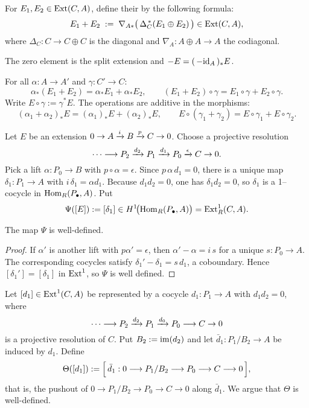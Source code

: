 
For \( E_1,E_2\in\operatorname{Ext}(C,A) \), define their  by the following formula:
\[
	E_1+E_2\;:=\; \nabla_{A*}\bigl(\,\Delta_C^{\,*}(E_1\oplus E_2)\,\bigr) \in \operatorname{Ext}(C,A),
\]
where \( \Delta_C: C\to C\oplus C \) is the diagonal and \( \nabla_A: A\oplus A\to A \) the codiagonal.

\vspace*{2mm}

The zero element is the split extension and \( -E=(\,-\mathrm{id}_A\,)_{*}E \).


For all \( \alpha: A\to A' \) and \( \gamma: C'\to C \):
\[
	\alpha_{*}(E_1+E_2)=\alpha_{*}E_1+\alpha_{*}E_2,\qquad (E_1+E_2)\circ\gamma = E_1\circ\gamma + E_2\circ\gamma.
\]
Write \( E\circ\gamma:=\gamma^{*}E \). The operations are additive in the morphisms:
\[
	(\alpha_1+\alpha_2)_{*}E = (\alpha_1)_{*}E + (\alpha_2)_{*}E,\qquad E\circ(\gamma_1+\gamma_2)=E\circ\gamma_1+E\circ\gamma_2.
\]

Let \( E \) be an extension \( 0\to A\xrightarrow{i} B\xrightarrow{p} C\to 0 \). Choose a projective resolution
\[
	\dotsm \longrightarrow P_2\xrightarrow{d_2} P_1\xrightarrow{d_1} P_0\xrightarrow{\epsilon} C \to 0.
\]
Pick a lift \( \alpha: P_0\to B \) with \( p\circ \alpha = \epsilon \). Since \( p\,\alpha\,d_1 = 0 \), there is a unique map \( \delta_1: P_1\to A \) with \( i\,\delta_1 = \alpha d_1 \). Because \( d_1 d_2=0 \), one has \( \delta_1 d_2 = 0 \), so \( \delta_1 \) is a 1–cocycle in \( \operatorname{Hom}_R(P_\bullet,A) \). Put
\[
	\Psi([E]) := [\delta_1] \in H^1\!\bigl(\operatorname{Hom}_R(P_\bullet,A)\bigr) = \operatorname{Ext}^1_R(C,A).
\]

\begin{lemma*}
	The map \( \Psi \) is well-defined.
\end{lemma*}
\begin{proof}
	If \( \alpha' \) is another lift with \( p\alpha' = \epsilon \), then \( \alpha' - \alpha = i\,s \) for a unique \( s: P_0\to A \). The corresponding cocycles satisfy \( \delta_1' - \delta_1 = s\,d_1 \), a coboundary. Hence \( [\delta_1'] = [\delta_1] \) in \( \operatorname{Ext}^1 \), so \( \Psi \) is well defined.
\end{proof}

Let \( [d_1] \in \operatorname{Ext}^1(C,A) \) be represented by a cocycle \( d_1: P_1 \to A \) with \( d_1 d_2 = 0 \), where
\[
	\dotsm \longrightarrow P_2 \xrightarrow{d_2} P_1 \xrightarrow{d_0} P_0 \longrightarrow C \to 0
\]
is a projective resolution of \( C \). Put \( B_2 := \operatorname{im}(d_2) \) and let \( \bar d_1: P_1/B_2 \to A \) be induced by \( d_1 \). Define
\[
	\Theta([d_1]) := \Bigl[\, \bar d_1 : 0 \longrightarrow P_1/B_2 \longrightarrow P_0 \longrightarrow C \longrightarrow 0 \,\Bigr],
\]
that is, the pushout of \( 0\to P_1/B_2 \to P_0 \to C \to 0 \) along \( \bar d_1 \). We argue that \( \Theta \) is well-defined.

